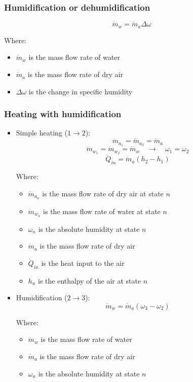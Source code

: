 \documentclass[11pt]{article}
\begin{document}
\subsubsection{Humidification or dehumidification}
\label{sec:org186ba5a}
\[\dot{m}_w = \dot{m}_a \Delta \omega\]

Where:
\begin{itemize}
\item \(\dot{m}_w\) is the mass flow rate of water
\item \(\dot{m}_a\) is the mass flow rate of dry air
\item \(\Delta \omega\) is the change in specific humidity
\end{itemize}

 \newpage

\subsubsection{Heating with humidification}
\label{sec:orgc90dbde}
\begin{itemize}
\item Simple heating (\(1 \rightarrow 2\)):
\[\dot{m}_{a_1} = \dot{m}_{a_2} = \dot{m}_a\]
\[\dot{m}_{w_1} = \dot{m}_{w_2} = \dot{m}_w \quad \rightarrow \quad \omega_1 = \omega_2\]
\[\dot{Q}_{in} = \dot{m}_a (h_2 - h_1)\]

Where:
\begin{itemize}
\item \(\dot{m}_{a_n}\) is the mass flow rate of dry air at state \(n\)
\item \(\dot{m}_{w_n}\) is the mass flow rate of water at state \(n\)
\item \(\omega_n\) is the absolute humidity at state \(n\)
\item \(\dot{m}_{a}\) is the mass flow rate of dry air
\item \(\dot{Q}_{in}\) is the heat input to the air
\item \(h_n\) is the enthalpy of the air at state \(n\)
\end{itemize}

\item Humidification (\(2 \rightarrow 3\)):
\[\dot{m}_w = \dot{m}_a (\omega_3 - \omega_2)\]

Where:
\begin{itemize}
\item \(\dot{m}_w\) is the mass flow rate of water
\item \(\dot{m}_{a}\) is the mass flow rate of dry air
\item \(\omega_n\) is the absolute humidity at state \(n\)
\end{itemize}
\end{itemize}
\end{document}
